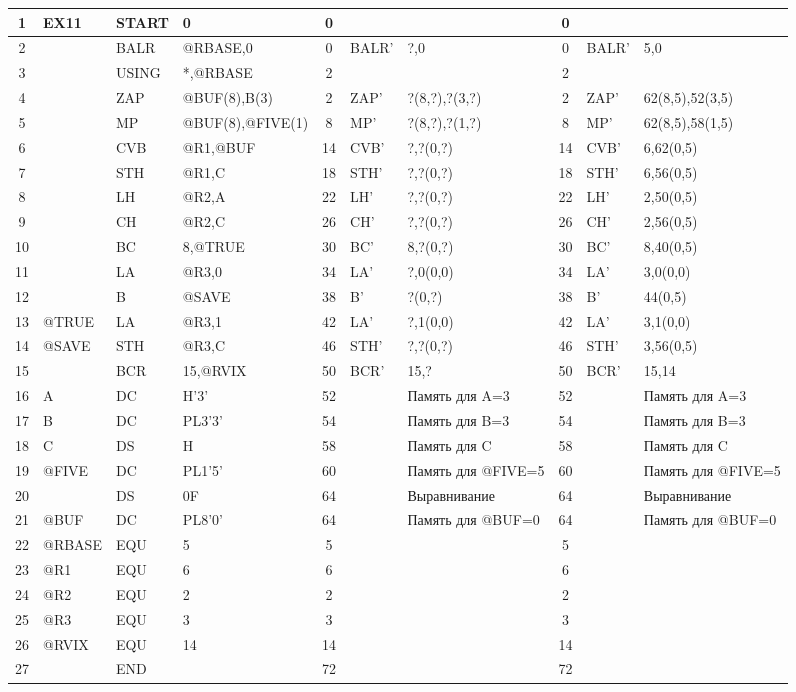 \documentclass[10pt, a4paper, landscape]{article}
\begin{document}
\begin{longtable}{|c|l|l|l|c|l|l|c|l|l|}
1 & EX11 & START & 0 & 0 & & & 0 & & \\ \hline
2 & & BALR & @RBASE,0 & 0 & BALR' & ?,0 & 0 & BALR' & 5,0 \\ \hline
3 & & USING & *,@RBASE & 2 & & & 2 & & \\ \hline
4 & & ZAP & @BUF(8),B(3) & 2 & ZAP' & ?(8,?),?(3,?) & 2 & ZAP' & 62(8,5),52(3,5) \\ \hline
5 & & MP & @BUF(8),@FIVE(1) & 8 & MP' & ?(8,?),?(1,?) & 8 & MP' & 62(8,5),58(1,5) \\ \hline
6 & & CVB & @R1,@BUF & 14 & CVB' & ?,?(0,?) & 14 & CVB' & 6,62(0,5) \\ \hline
7 & & STH & @R1,C & 18 & STH' & ?,?(0,?) & 18 & STH' & 6,56(0,5) \\ \hline
8 & & LH & @R2,A & 22 & LH' & ?,?(0,?) & 22 & LH' & 2,50(0,5) \\ \hline
9 & & CH & @R2,C & 26 & CH' & ?,?(0,?) & 26 & CH' & 2,56(0,5) \\ \hline
10 & & BC & 8,@TRUE & 30 & BC' & 8,?(0,?) & 30 & BC' & 8,40(0,5) \\ \hline
11 & & LA & @R3,0 & 34 & LA' & ?,0(0,0) & 34 & LA' & 3,0(0,0) \\ \hline
12 & & B & @SAVE & 38 & B' & ?(0,?) & 38 & B' & 44(0,5) \\ \hline
13 & @TRUE & LA & @R3,1 & 42 & LA' & ?,1(0,0) & 42 & LA' & 3,1(0,0) \\ \hline
14 & @SAVE & STH & @R3,C & 46 & STH' & ?,?(0,?) & 46 & STH' & 3,56(0,5) \\ \hline
15 & & BCR & 15,@RVIX & 50 & BCR' & 15,? & 50 & BCR' & 15,14 \\ \hline
16 & A & DC & H'3' & 52 & & Память для A=3 & 52 & & Память для A=3 \\ \hline
17 & B & DC & PL3'3' & 54 & & Память для B=3 & 54 & & Память для B=3 \\ \hline
18 & C & DS & H & 58 & & Память для C & 58 & & Память для C \\ \hline
19 & @FIVE & DC & PL1'5' & 60 & & Память для @FIVE=5 & 60 & & Память для @FIVE=5 \\ \hline
20 & & DS & 0F & 64 & & Выравнивание & 64 & & Выравнивание \\ \hline
21 & @BUF & DC & PL8'0' & 64 & & Память для @BUF=0 & 64 & & Память для @BUF=0 \\ \hline
22 & @RBASE & EQU & 5 & 5 & & & 5 & & \\ \hline
23 & @R1 & EQU & 6 & 6 & & & 6 & & \\ \hline
24 & @R2 & EQU & 2 & 2 & & & 2 & & \\ \hline
25 & @R3 & EQU & 3 & 3 & & & 3 & & \\ \hline
26 & @RVIX & EQU & 14 & 14 & & & 14 & & \\ \hline
27 & & END & & 72 & & & 72 & & \\ \hline
\end{longtable}
\end{document}
